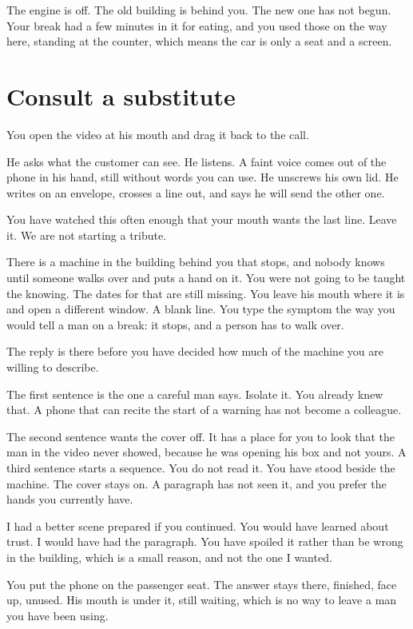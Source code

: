 \documentclass[11pt,oneside]{book}
\begin{document}
The engine is off. The old building is behind you. The new one has not begun. Your break had a few minutes in it for eating, and you used those on the way here, standing at the counter, which means the car is only a seat and a screen.

\section*{Consult a substitute}

You open the video at his mouth and drag it back to the call.

He asks what the customer can see. He listens. A faint voice comes out of the phone in his hand, still without words you can use. He unscrews his own lid. He writes on an envelope, crosses a line out, and says he will send the other one.

You have watched this often enough that your mouth wants the last line. Leave it. We are not starting a tribute.

There is a machine in the building behind you that stops, and nobody knows until someone walks over and puts a hand on it. You were not going to be taught the knowing. The dates for that are still missing. You leave his mouth where it is and open a different window. A blank line. You type the symptom the way you would tell a man on a break: it stops, and a person has to walk over.

The reply is there before you have decided how much of the machine you are willing to describe.

The first sentence is the one a careful man says. Isolate it. You already knew that. A phone that can recite the start of a warning has not become a colleague.

The second sentence wants the cover off. It has a place for you to look that the man in the video never showed, because he was opening his box and not yours. A third sentence starts a sequence. You do not read it. You have stood beside the machine. The cover stays on. A paragraph has not seen it, and you prefer the hands you currently have.

I had a better scene prepared if you continued. You would have learned about trust. I would have had the paragraph. You have spoiled it rather than be wrong in the building, which is a small reason, and not the one I wanted.

You put the phone on the passenger seat. The answer stays there, finished, face up, unused. His mouth is under it, still waiting, which is no way to leave a man you have been using.
\end{document}
